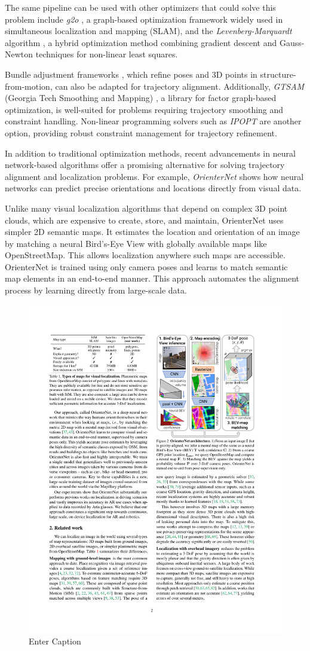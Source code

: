 The same pipeline can be used with other optimizers that could solve this problem include \textit{g2o} \cite{Kummerle_g2o_2011}, a graph-based optimization framework widely used in simultaneous localization and mapping (SLAM), and the \textit{Levenberg-Marquardt} algorithm \cite{Levenberg_LMA_1944, Marquardt_LMA_1963}, a hybrid optimization method combining gradient descent and Gauss-Newton techniques for non-linear least squares. 

Bundle adjustment frameworks \cite{Triggs_BA_1999}, which refine poses and 3D points in structure-from-motion, can also be adapted for trajectory alignment. Additionally, \textit{GTSAM} (Georgia Tech Smoothing and Mapping) \cite{Dellaert_GTSAM_2012}, a library for factor graph-based optimization, is well-suited for problems requiring trajectory smoothing and constraint handling. Non-linear programming solvers such as \textit{IPOPT} \cite{Wachter_IPOPT_2006} are another option, providing robust constraint management for trajectory refinement. 

In addition to traditional optimization methods, recent advancements in neural network-based algorithms offer a promising alternative for solving trajectory alignment and localization problems. For example, \textit{OrienterNet} \cite{sarlin2023orienternetvisuallocalization2d} shows how neural networks can predict precise orientations and locations directly from visual data.

Unlike many visual localization algorithms that depend on complex 3D point clouds, which are expensive to create, store, and maintain, OrienterNet uses simpler 2D semantic maps. It estimates the location and orientation of an image by matching a neural Bird’s-Eye View with globally available maps like OpenStreetMap. This allows localization anywhere such maps are accessible. OrienterNet is trained using only camera poses and learns to match semantic map elements in an end-to-end manner. This approach automates the alignment process by learning directly from large-scale data.

\begin{figure}[H]
    \centering
    \includegraphics[width=0.55\linewidth]{LateX//figs/2304.02009v1.pdf}
    \caption{Enter Caption}
    \label{fig:enter-label}
\end{figure}


